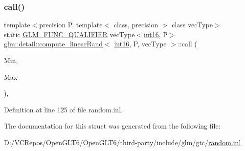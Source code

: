 \subsubsection{\texorpdfstring{call()}{call()}}
{\footnotesize\ttfamily template$<$precision P, template$<$ class, precision $>$ class vec\+Type$>$ \\
static \mbox{\hyperlink{setup_8hpp_a33fdea6f91c5f834105f7415e2a64407}{G\+L\+M\+\_\+\+F\+U\+N\+C\+\_\+\+Q\+U\+A\+L\+I\+F\+I\+ER}} vec\+Type$<$\mbox{\hyperlink{namespaceglm_1_1detail_a375938874ca4f0a0982ec6373b56117b}{int16}}, P$>$ \mbox{\hyperlink{structglm_1_1detail_1_1compute__linear_rand}{glm\+::detail\+::compute\+\_\+linear\+Rand}}$<$ \mbox{\hyperlink{namespaceglm_1_1detail_a375938874ca4f0a0982ec6373b56117b}{int16}}, P, vec\+Type $>$\+::call (\begin{DoxyParamCaption}\item[{vec\+Type$<$ \mbox{\hyperlink{namespaceglm_1_1detail_a375938874ca4f0a0982ec6373b56117b}{int16}}, P $>$ const \&}]{Min,  }\item[{vec\+Type$<$ \mbox{\hyperlink{namespaceglm_1_1detail_a375938874ca4f0a0982ec6373b56117b}{int16}}, P $>$ const \&}]{Max }\end{DoxyParamCaption})\hspace{0.3cm}{\ttfamily [inline]}, {\ttfamily [static]}}



Definition at line 125 of file random.\+inl.



The documentation for this struct was generated from the following file\+:\begin{DoxyCompactItemize}
\item 
D\+:/\+V\+C\+Repos/\+Open\+G\+L\+T6/\+Open\+G\+L\+T6/third-\/party/include/glm/gtc/\mbox{\hyperlink{random_8inl}{random.\+inl}}\end{DoxyCompactItemize}
